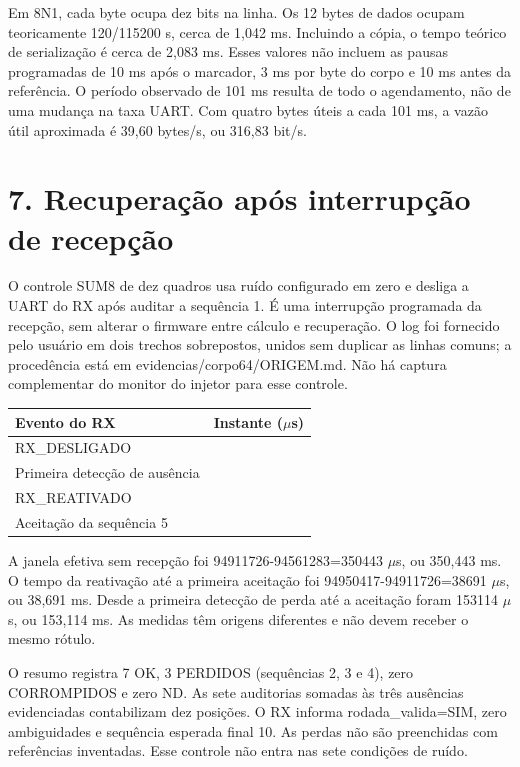 \documentclass[11pt,a4paper]{article}
\begin{document}
Em 8N1, cada byte ocupa dez bits na linha. Os 12 bytes de dados ocupam teoricamente 120/115200 s, cerca de 1,042 ms. Incluindo a cópia, o tempo teórico de serialização é cerca de 2,083 ms. Esses valores não incluem as pausas programadas de 10 ms após o marcador, 3 ms por byte do corpo e 10 ms antes da referência. O período observado de 101 ms resulta de todo o agendamento, não de uma mudança na taxa UART. Com quatro bytes úteis a cada 101 ms, a vazão útil aproximada é 39,60 bytes/s, ou 316,83 bit/s.


\section*{7. Recuperação após interrupção de recepção}

O controle SUM8 de dez quadros usa ruído configurado em zero e desliga a UART do RX após auditar a sequência 1. É uma interrupção programada da recepção, sem alterar o firmware entre cálculo e recuperação. O log foi fornecido pelo usuário em dois trechos sobrepostos, unidos sem duplicar as linhas comuns; a procedência está em evidencias/corpo64/ORIGEM.md. Não há captura complementar do monitor do injetor para esse controle.


\begin{longtable}{>{\raggedright\arraybackslash}p{2.81cm}>{\raggedright\arraybackslash}p{12.39cm}}

Evento do RX & Instante (\ensuremath{\mu}s) \\ \hline\endhead

RX\_DESLIGADO & 94561283 \\ 

Primeira detecção de ausência & 94797303 \\ 

RX\_REATIVADO & 94911726 \\ 

Aceitação da sequência 5 & 94950417 \\ 

\end{longtable}

A janela efetiva sem recepção foi 94911726-94561283=350443 \ensuremath{\mu}s, ou 350,443 ms. O tempo da reativação até a primeira aceitação foi 94950417-94911726=38691 \ensuremath{\mu}s, ou 38,691 ms. Desde a primeira detecção de perda até a aceitação foram 153114 \ensuremath{\mu}s, ou 153,114 ms. As medidas têm origens diferentes e não devem receber o mesmo rótulo.


O resumo registra 7 OK, 3 PERDIDOS (sequências 2, 3 e 4), zero CORROMPIDOS e zero ND. As sete auditorias somadas às três ausências evidenciadas contabilizam dez posições. O RX informa rodada\_valida=SIM, zero ambiguidades e sequência esperada final 10. As perdas não são preenchidas com referências inventadas. Esse controle não entra nas sete condições de ruído.
\end{document}
